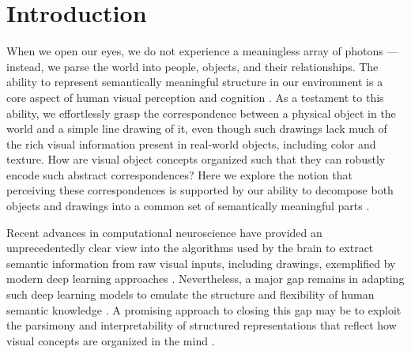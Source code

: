 \documentclass[10pt,letterpaper]{article}
\begin{document}
\section{Introduction}


When we open our eyes, we do not experience a meaningless array of photons --- instead, we parse the world into people, objects, and their relationships. 
The ability to represent semantically meaningful structure in our environment is a core aspect of human visual perception and cognition \cite{navon1977forest}. 
As a testament to this ability, we effortlessly grasp the correspondence between a physical object in the world and a simple line drawing of it, even though such drawings lack much of the rich visual information present in real-world objects, including color and texture. 
How are visual object concepts organized such that they can robustly encode such abstract correspondences?
Here we explore the notion that perceiving these correspondences is supported by our ability to decompose both objects and drawings into a common set of semantically meaningful parts \cite{biederman1988surface}. 

Recent advances in computational neuroscience have provided an unprecedentedly clear view into the algorithms used by the brain to extract semantic information from raw visual inputs, including drawings, exemplified by modern deep learning approaches \cite{FanCommon2018,yamins2014performance}.
Nevertheless, a major gap remains in adapting such deep learning models to emulate the structure and flexibility of human semantic knowledge \cite{lake2017building}.
A promising approach to closing this gap may be to exploit the parsimony and interpretability of structured representations that reflect how visual concepts are organized in the mind \cite{battaglia2018relational}.
\end{document}
